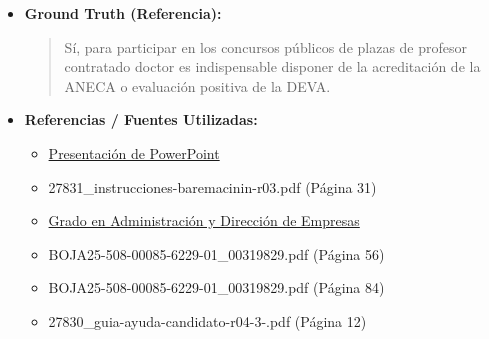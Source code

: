 \documentclass[12pt,a4paper,oneside]{report}
\begin{document}
\begin{itemize}
\begin{itemize}
\begin{quote}
En conclusión, si bien la acreditación de ANECA o entidad similar no es obligatoria per se para optar a plazas de Profesor Contratado Doctor, tener acreditaciones o cumplir con ciertos requisitos establecidos por la LOSU y la normativa de la Universidad de Sevilla es crucial. Los candidatos deben verificar los requisitos específicos para cada convocatoria de concurso de acceso a plazas de profesorado en la Universidad de Sevilla, ya que pueden variar.

Es importante consultar directamente las convocatorias específicas de la Universidad de Sevilla y los documentos normativos citados para obtener información actualizada y precisa sobre los requisitos para optar a plazas de Profesor Contratado Doctor.
                \end{quote}
          \item \textbf{{Ground Truth (Referencia):}} \\
                \begin{quote}
Sí, para participar en los concursos públicos de plazas de profesor contratado doctor es indispensable disponer de la acreditación de la ANECA o evaluación positiva de la DEVA.
                \end{quote}
          \item \textbf{{Referencias / Fuentes Utilizadas:}} \\
                \begin{itemize}
                  \item \href{https://bib.us.es/bellasartes/sites/bib3.us.es.bellasartes/files/aneca22.pdf}{Presentación de PowerPoint}
                  \item 27831\_instrucciones-baremacinin-r03.pdf (Página 31)
                  \item \href{https://www.us.es/estudiar/que-estudiar/oferta-de-grados/grado-en-administracion-y-direccion-de-empresas}{Grado en Administración y Dirección de Empresas}
                  \item BOJA25-508-00085-6229-01\_00319829.pdf (Página 56)
                  \item BOJA25-508-00085-6229-01\_00319829.pdf (Página 84)
                  \item 27830\_guia-ayuda-candidato-r04-3-.pdf (Página 12)
                \end{itemize}
        \end{itemize}


\end{itemize}
\end{document}
